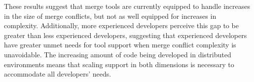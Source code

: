 These results suggest that merge tools are currently equipped to handle increases in the size of merge conflicts, but not as well equipped for increases in complexity.
Additionally, more experienced developers perceive this gap to be greater than less experienced developers, suggesting that experienced developers have greater unmet needs for tool support when merge conflict complexity is unavoidable.
The increasing amount of code being developed in distributed environments means that scaling support in both dimensions is necessary to accommodate all developers' needs.